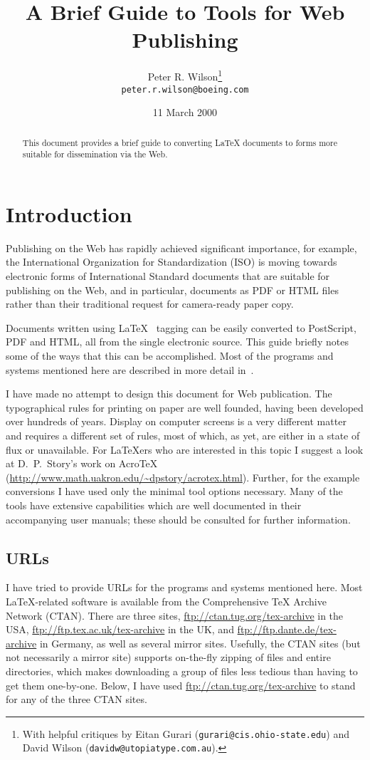 \documentclass[11pt]{article}
\title{A Brief Guide to \latex{} Tools for Web Publishing}
\author{Peter R. Wilson\thanks{With helpful critiques by 
Eitan Gurari (\texttt{gurari@cis.ohio-state.edu}) and 
David Wilson (\texttt{davidw@utopiatype.com.au}).} \\
        \texttt{peter.r.wilson@boeing.com}}
\date{11 March 2000}
\newcommand{\latex}{LaTeX}
\begin{document}
\pagestyle{headings}
\maketitle
\begin{abstract}
This document provides a brief guide to converting \latex{} documents
to forms more suitable for dissemination via the Web.
\end{abstract}
\tableofcontents
\listoffigures
\clearpage
{}

\section{Introduction}

    Publishing on the Web has rapidly achieved significant importance,
for example, the International Organization for Standardization (ISO) 
is moving towards electronic forms of International Standard documents
that are suitable for publishing on the Web, and in particular, documents
as PDF or HTML files rather than their traditional request for camera-ready 
paper copy.

    Documents written using \latex~\cite{LAMPORT94} tagging can be 
easily converted to
PostScript, PDF and HTML, all from the single electronic source. This
guide briefly notes some of the ways that this can be accomplished.
    Most of the programs and systems mentioned here are described in more
detail in~\cite{GOOSSENS99}.

    I have made no attempt to design this document for Web publication. The
typographical rules for printing on paper are well founded, having been
developed over hundreds of years. Display on computer screens is a
very different matter and requires a different set of rules, most of which,
as yet, are either in a state of flux or unavailable. For LaTeXers who
are interested in this topic I suggest a look at D.~P.~Story's work on
AcroTeX (\url{http://www.math.uakron.edu/~dpstory/acrotex.html}). Further,
for the example conversions I have used only the minimal tool options 
necessary. Many of the tools have extensive capabilities which are well 
documented in their accompanying user manuals; these should be consulted for
further information.


\subsection{URLs}

    I have tried to provide URLs for the programs and systems mentioned
here. Most \latex-related software is available from the Comprehensive
TeX Archive Network (CTAN). There are three sites, 
\url{ftp://ctan.tug.org/tex-archive} in the USA, 
\url{ftp://ftp.tex.ac.uk/tex-archive} in the UK, and 
\url{ftp://ftp.dante.de/tex-archive} in Germany, as well as several mirror
sites. Usefully, the CTAN sites (but not necessarily a mirror site) supports
on-the-fly zipping of files and entire directories, which makes downloading
a group of files less tedious than having to get them one-by-one. Below,
I have used \url{ftp://ctan.tug.org/tex-archive} to stand for any of
the three CTAN sites.
\end{document}

